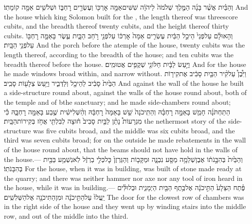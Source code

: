 {וְהַבַּ֗יִת אֲשֶׁ֨ר בָּנָ֜ה הַמֶּ֤לֶךְ שְׁלֹמֹה֙ לַיהֹוָ֔ה שִׁשִּׁים\maqqaf אַמָּ֥ה אׇרְכּ֖וֹ וְעֶשְׂרִ֣ים רׇחְבּ֑וֹ וּשְׁלֹשִׁ֥ים אַמָּ֖ה קוֹמָתֽוֹ׃}
{And the house which king Solomon built for the \lord, the length thereof was threescore cubits, and the breadth thereof twenty cubits, and the height thereof thirty cubits.}
{וְהָאוּלָ֗ם עַל\maqqaf פְּנֵי֙ הֵיכַ֣ל הַבַּ֔יִת עֶשְׂרִ֤ים אַמָּה֙ אׇרְכּ֔וֹ עַל\maqqaf פְּנֵ֖י רֹ֣חַב הַבָּ֑יִת עֶ֧שֶׂר בָּאַמָּ֛ה רׇחְבּ֖וֹ עַל\maqqaf פְּנֵ֥י הַבָּֽיִת׃}
{And the porch before the atemple of the house, twenty cubits was the length thereof, according to the breadth of the house; and ten cubits was the breadth thereof before the house.}
{וַיַּ֣עַשׂ לַבָּ֔יִת חַלּוֹנֵ֖י שְׁקֻפִ֥ים אֲטוּמִֽים׃}
{And for the house he made windows broad within, and narrow without.}
{וַיִּ֩בֶן֩ עַל\maqqaf קִ֨יר הַבַּ֤יִת  סָבִ֔יב אֶת\maqqaf קִיר֤וֹת הַבַּ֙יִת֙ סָבִ֔יב לַהֵיכָ֖ל וְלַדְּבִ֑יר וַיַּ֥עַשׂ צְלָע֖וֹת סָבִֽיב׃}
{And against the wall of the house he built a side-structure round about, against the walls of the house round about, both of the temple and of bthe sanctuary; and he made side-chambers round about;}
{ הַתַּחְתֹּנָ֜ה חָמֵ֧שׁ בָּאַמָּ֣ה רׇחְבָּ֗הּ וְהַתִּֽיכֹנָה֙ שֵׁ֤שׁ בָּאַמָּה֙ רׇחְבָּ֔הּ וְהַ֨שְּׁלִישִׁ֔ית שֶׁ֥בַע בָּאַמָּ֖ה רׇחְבָּ֑הּ כִּ֡י מִגְרָעוֹת֩ נָתַ֨ן לַבַּ֤יִת סָבִיב֙ ח֔וּצָה לְבִלְתִּ֖י אֲחֹ֥ז בְּקִירוֹת\maqqaf הַבָּֽיִת׃}
{the nethermost story of the side-structure was five cubits broad, and the middle was six cubits broad, and the third was seven cubits broad; for on the outside he made rebatements in the wall of the house round about, that the beams should not have hold in the walls of the house.—}
{וְהַבַּ֙יִת֙ בְּהִבָּ֣נֹת֔וֹ אֶבֶן\maqqaf שְׁלֵמָ֥ה מַסָּ֖ע נִבְנָ֑ה וּמַקָּב֤וֹת וְהַגַּרְזֶן֙ כׇּל\maqqaf כְּלִ֣י בַרְזֶ֔ל לֹֽא\maqqaf נִשְׁמַ֥ע בַּבַּ֖יִת בְּהִבָּנֹתֽוֹ׃}
{For the house, when it was in building, was built of stone made ready at the quarry; and there was neither hammer nor axe nor any tool of iron heard in the house, while it was in building.—}
{פֶּ֗תַח הַצֵּלָע֙ הַתִּ֣יכֹנָ֔ה אֶל\maqqaf כֶּ֥תֶף הַבַּ֖יִת הַיְמָנִ֑ית וּבְלוּלִּ֗ים יַֽעֲלוּ֙ עַל\maqqaf הַתִּ֣יכֹנָ֔ה וּמִן\maqqaf הַתִּיכֹנָ֖ה אֶל\maqqaf הַשְּׁלִשִֽׁים׃}
{The door for the clowest row of chambers was in the right side of the house and they went up by winding stairs into the middle row, and out of the middle into the third.}
